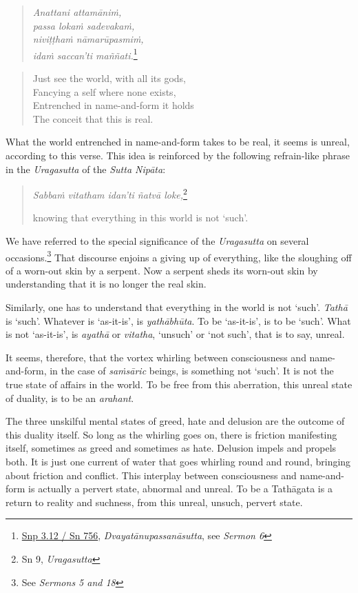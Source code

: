 \begin{quote}
\emph{Anattani attamāniṁ,}\\
\emph{passa lokaṁ sadevakaṁ,}\\
\emph{niviṭṭhaṁ nāmarūpasmiṁ,}\\
\emph{idaṁ saccan'ti maññati.}\footnote{\href{https://suttacentral.net/snp3.12/pli/ms}{Snp 3.12 / Sn 756}, \emph{Dvayatānupassanāsutta}, see \emph{Sermon 6}}
\end{quote}

\begin{quote}
Just see the world, with all its gods,\\
Fancying a self where none exists,\\
Entrenched in name-and-form it holds\\
The conceit that this is real.
\end{quote}

What the world entrenched in name-and-form takes to be real, it seems is unreal, according to this verse. This idea is reinforced by the following refrain-like phrase in the \emph{Uragasutta} of the \emph{Sutta Nipāta}:

\begin{quote}
\emph{Sabbaṁ vitatham idan'ti ñatvā loke,}\footnote{Sn 9, \emph{Uragasutta}}

knowing that everything in this world is not `such'.
\end{quote}

We have referred to the special significance of the \emph{Uragasutta} on several occasions.\footnote{See \emph{Sermons 5 and 18}} That discourse enjoins a giving up of everything, like the sloughing off of a worn-out skin by a serpent. Now a serpent sheds its worn-out skin by understanding that it is no longer the real skin.

Similarly, one has to understand that everything in the world is not `such'. \emph{Tathā} is `such'. Whatever is `as-it-is', is \emph{yathābhūta}. To be `as-it-is', is to be `such'. What is not `as-it-is', is \emph{ayathā} or \emph{vitatha}, `unsuch' or `not such', that is to say, unreal.

It seems, therefore, that the vortex whirling between consciousness and name-and-form, in the case of \emph{saṁsāric} beings, is something not `such'. It is not the true state of affairs in the world. To be free from this aberration, this unreal state of duality, is to be an \emph{arahant}.

The three unskilful mental states of greed, hate and delusion are the outcome of this duality itself. So long as the whirling goes on, there is friction manifesting itself, sometimes as greed and sometimes as hate. Delusion impels and propels both. It is just one current of water that goes whirling round and round, bringing about friction and conflict. This interplay between consciousness and name-and-form is actually a pervert state, abnormal and unreal. To be a Tathāgata is a return to reality and suchness, from this unreal, unsuch, pervert state.

